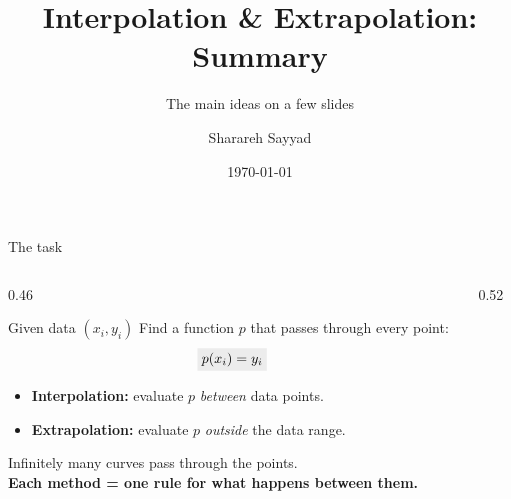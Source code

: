 \documentclass[aspectratio=169]{beamer}
\title{Interpolation \& Extrapolation: Summary}
\subtitle{The main ideas on a few slides}
\author{Sharareh Sayyad}
\institute{Washington State University}
\date{\today}
\newcommand{\cbox}[2]{\colorbox{#1}{\ensuremath{\displaystyle #2}}}
\begin{document}
\frame{\titlepage}

\begin{frame}{The task}
\begin{columns}[T]
\begin{column}{0.46\textwidth}
\small
\begin{block}{Given data $(x_i, y_i)$}
Find a function $p$ that passes through every point:
\[
\cbox{gray!15}{p(x_i) = y_i}
\]
\end{block}
\begin{itemize}
\item \textbf{\color{accent}Interpolation:} evaluate $p$ \emph{between} data points.
\item \textbf{\color{hl}Extrapolation:} evaluate $p$ \emph{outside} the data range.
\end{itemize}
\vspace{0.3em}
Infinitely many curves pass through the points.\\
\textbf{Each method = one rule for what happens between them.}
\end{column}
\begin{column}{0.52\textwidth}
\centering
{}
\end{column}
\end{columns}
\end{frame}
\end{document}
